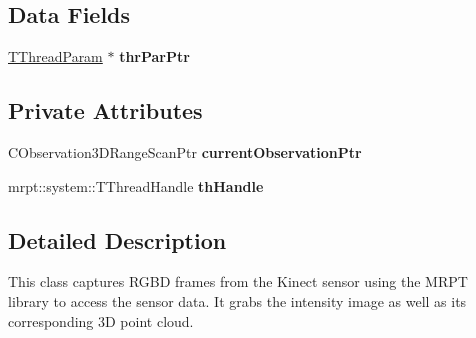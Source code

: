 \subsection*{Data Fields}
\begin{DoxyCompactItemize}
\item 
\hypertarget{class_kinect_grabber___m_r_p_t_ac5c832a0409b5da3777f0266e84ef978}{
\hyperlink{struct_kinect_grabber___m_r_p_t_1_1_t_thread_param}{TThreadParam} $\ast$ {\bfseries thrParPtr}}
\label{class_kinect_grabber___m_r_p_t_ac5c832a0409b5da3777f0266e84ef978}

\end{DoxyCompactItemize}
\subsection*{Private Attributes}
\begin{DoxyCompactItemize}
\item 
\hypertarget{class_kinect_grabber___m_r_p_t_a6c0a144f3022d3a63d13dc96e3f4458d}{
CObservation3DRangeScanPtr {\bfseries currentObservationPtr}}
\label{class_kinect_grabber___m_r_p_t_a6c0a144f3022d3a63d13dc96e3f4458d}

\item 
\hypertarget{class_kinect_grabber___m_r_p_t_aea9a7c992f3236da3c3b35acca25fdba}{
mrpt::system::TThreadHandle {\bfseries thHandle}}
\label{class_kinect_grabber___m_r_p_t_aea9a7c992f3236da3c3b35acca25fdba}

\end{DoxyCompactItemize}


\subsection{Detailed Description}
This class captures RGBD frames from the Kinect sensor using the MRPT library to access the sensor data. It grabs the intensity image as well as its corresponding 3D point cloud. 

